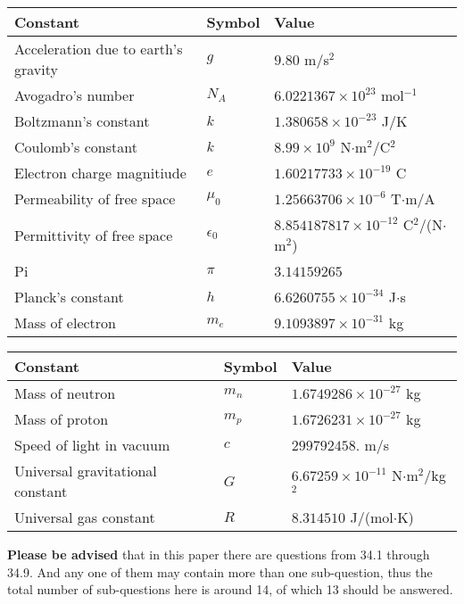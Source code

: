 \documentclass[12pt]{article}
\begin{document}
 
 
\noindent\begin{tabular}{|l|l|l|}
\hline
Constant & Symbol & Value \\
\hline
Acceleration due to earth's gravity &
$g$ &
 $ 9.80 $
m/s$^2$ \\
\hline
Avogadro's number &
$N_A$ &
 $ 6.0221367 \times 10^{23} $
mol$^{-1}$ \\
\hline
Boltzmann's constant &
$k$ &
 $ 1.380658 \times 10^{-23} $
J/K \\
\hline
Coulomb's constant &
$k$ &
 $ 8.99 \times 10^{9} $
N$\cdot $m$^2$/C$^2$ \\
\hline
Electron charge magnitiude &
$e$ &
 $ 1.60217733 \times 10^{-19} $
C \\
\hline
Permeability of free space &
$\mu _0$ &
 $ 1.25663706 \times 10^{-6} $
T$\cdot $m/A \\
\hline
Permittivity of free space &
$\epsilon _0$ &
 $ 8.854187817 \times 10^{-12} $
C$^2$/(N$\cdot $m$^2$) \\
\hline
Pi &
$\pi$ &
 $ 3.14159265 $
$ $ \\
\hline
Planck's constant &
$h$ &
 $ 6.6260755 \times 10^{-34} $
J$\cdot $s \\
\hline
Mass of electron &
$m_e$ &
 $ 9.1093897 \times 10^{-31} $
kg \\
\hline
\end{tabular}
 
 
\noindent\begin{tabular}{|l|l|l|}
\hline
Constant & Symbol & Value \\
\hline
Mass of neutron &
$m_n$ &
 $ 1.6749286 \times 10^{-27} $
kg \\
\hline
Mass of proton &
$m_p$ &
 $ 1.6726231 \times 10^{-27} $
kg \\
\hline
Speed of light in vacuum &
$c$ &
 $ 299792458. $
m/s \\
\hline
Universal gravitational constant &
$G$ &
 $ 6.67259 \times 10^{-11} $
N$\cdot $m$^2$/kg$^2$ \\
\hline
Universal gas constant &
$R$ &
 $ 8.314510 $
J/(mol$\cdot $K) \\
\hline
\end{tabular}
 
 
{\textbf{\large{Please be advised}}} that in this paper there are questions from
34.1 through
34.9.
And any one of them may contain more than one sub-question, thus the total number
of sub-questions here is around 14, of which
13 should be answered.
 
\end{document}
